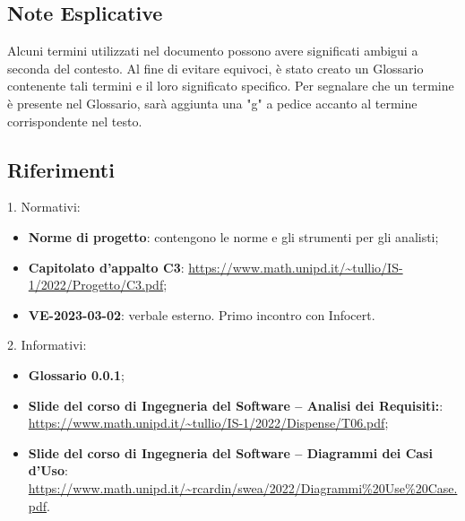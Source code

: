\subsection{Note Esplicative}
Alcuni termini utilizzati nel documento possono avere significati ambigui a seconda del contesto. Al fine di evitare equivoci, è stato creato un Glossario contenente tali termini 
e il loro significato specifico. Per segnalare che un termine è presente nel Glossario, sarà aggiunta una "g" a pedice accanto al termine corrispondente nel testo.

\subsection{Riferimenti}
1. Normativi: 
\begin{itemize}
    \item \textbf{Norme di progetto}: contengono le norme e gli strumenti per gli analisti;
    \item \textbf{Capitolato d’appalto C3}: \url{https://www.math.unipd.it/~tullio/IS-1/2022/Progetto/C3.pdf};
    \item \textbf{VE-2023-03-02}: verbale esterno. Primo incontro con Infocert.
\end{itemize}
2. Informativi: 
\begin{itemize}
    \item \textbf{Glossario 0.0.1};
    \item \textbf{Slide del corso di Ingegneria del Software – Analisi dei Requisiti:}: \url{https://www.math.unipd.it/~tullio/IS-1/2022/Dispense/T06.pdf};
    \item \textbf{Slide del corso di Ingegneria del Software – Diagrammi dei Casi d’Uso}: \url{https://www.math.unipd.it/~rcardin/swea/2022/Diagrammi%20Use%20Case.pdf}.
\end{itemize}